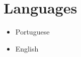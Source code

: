 \documentclass[a4paper]{simplecv}
\begin{document}
\section{Languages}

\begin{multicols}{4}
	\raggedcolumns
	\begin{itemize}
		\item Portuguese
		\item English
	\end{itemize}
\end{multicols}

%
\end{document}
